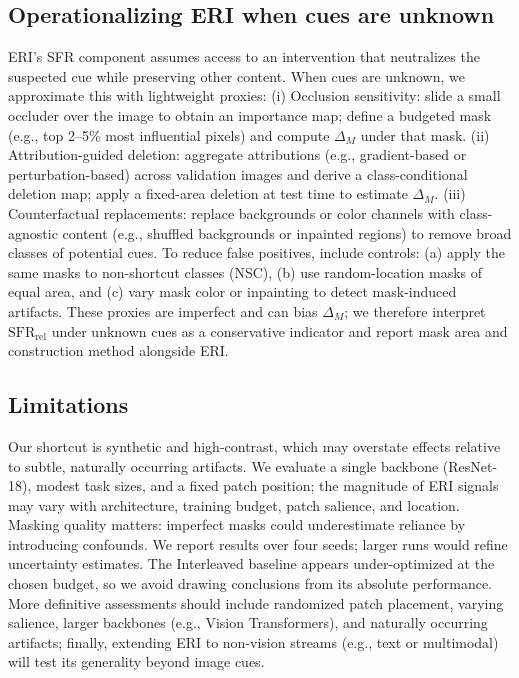\documentclass[conference]{IEEEtran}
\begin{document}
\subsection{Operationalizing ERI when cues are unknown}
ERI’s SFR component assumes access to an intervention that neutralizes the suspected cue while preserving other content. When cues are unknown, we approximate this with lightweight proxies:
(i) Occlusion sensitivity: slide a small occluder over the image to obtain an importance map; define a budgeted mask (e.g., top 2–5\% most influential pixels) and compute \(\Delta_M\) under that mask. 
(ii) Attribution-guided deletion: aggregate attributions (e.g., gradient-based or perturbation-based) across validation images and derive a class-conditional deletion map; apply a fixed-area deletion at test time to estimate \(\Delta_M\).
(iii) Counterfactual replacements: replace backgrounds or color channels with class-agnostic content (e.g., shuffled backgrounds or inpainted regions) to remove broad classes of potential cues.
To reduce false positives, include controls: (a) apply the same masks to non-shortcut classes (NSC), (b) use random-location masks of equal area, and (c) vary mask color or inpainting to detect mask-induced artifacts. These proxies are imperfect and can bias \(\Delta_M\); we therefore interpret \(\mathrm{SFR}_{\mathrm{rel}}\) under unknown cues as a conservative indicator and report mask area and construction method alongside ERI.

\subsection{Limitations}
Our shortcut is synthetic and high-contrast, which may overstate effects relative to subtle, naturally occurring artifacts. We evaluate a single backbone (ResNet-18), modest task sizes, and a fixed patch position; the magnitude of ERI signals may vary with architecture, training budget, patch salience, and location. Masking quality matters: imperfect masks could underestimate reliance by introducing confounds. We report results over four seeds; larger runs would refine uncertainty estimates. The Interleaved baseline appears under-optimized at the chosen budget, so we avoid drawing conclusions from its absolute performance. More definitive assessments should include randomized patch placement, varying salience, larger backbones (e.g., Vision Transformers), and naturally occurring artifacts; finally, extending ERI to non-vision streams (e.g., text or multimodal) will test its generality beyond image cues.
\end{document}
